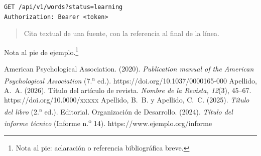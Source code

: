 \documentclass[letterpaper]{wordglow}   %
\begin{document}
\begin{lstlisting}
GET /api/v1/words?status=learning
Authorization: Bearer <token>
\end{lstlisting}
\vskip16.5pt

\begin{quote}
Cita textual de una fuente, con la referencia al final de la l\'inea.
\end{quote}


Nota al pie de ejemplo.\footnote{Nota al pie: aclaraci\'on o referencia
bibliogr\'afica breve.}

\clearpage

\begin{referencias}
 American Psychological Association. (2020). \textit{Publication manual
of the American Psychological Association} (7.\textsuperscript{a} ed.).
https://doi.org/10.1037/0000165-000
 Apellido, A.~A. (2026). T\'itulo del art\'iculo de revista.
\textit{Nombre de la Revista, 12}(3), 45--67. https://doi.org/10.0000/xxxxx
 Apellido, B.~B. y Apellido, C.~C. (2025). \textit{T\'itulo del libro}
(2.\textsuperscript{a} ed.). Editorial.
 Organizaci\'on de Desarrollo. (2024). \textit{T\'itulo del informe
t\'ecnico} (Informe n.\textsuperscript{o} 14). https://www.ejemplo.org/informe
\end{referencias}


\wgcierre
\end{document}
